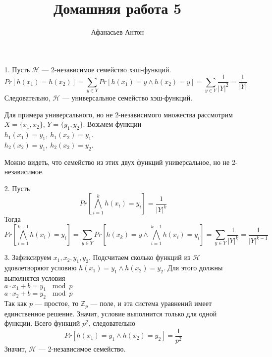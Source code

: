 \documentclass[10pt]{article}
\begin{document}
\title{Домашняя работа 5}
\author{Афанасьев Антон}
\maketitle

\begin{enumerate}
	\item[1.] Пусть $\mathcal{H}$ --- 2-независимое семейство хэш-функций.
	$$Pr[h(x_1) = h(x_2)] = \sum_{y \in Y} Pr[h(x_1) = y \land h(x_2) = y] = \sum_{y \in Y} \frac{1}{|Y|^2} = \frac{1}{|Y|}$$
	Следовательно, $\mathcal{H}$ --- универсальное семейство хэш-функций.
	
	Для примера универсального, но не 2-независимого множества рассмотрим $X=\{ x_1, x_2 \}$, $Y=\{y_1, y_2 \}$. Возьмем функции\\ $h_1(x_1) = y_1,\ h_1(x_2) = y_1$.\\
$h_2(x_2) = y_1,\ h_2(x_2) = y_2$.

Можно видеть, что семейство из этих двух функций универсальное, но не 2-независимое.

	\item[2.] Пусть 
		$$Pr \left [ \bigwedge_{i=1}^k h(x_i) = y_i \right ] = \frac{1}{|Y|^k}$$
		Тогда 
		$$Pr \left [ \bigwedge_{i=1}^{k-1} h(x_i) = y_i \right ] = \sum_{y \in Y} Pr \left [ h(x_k) = y \land \bigwedge_{i=1}^{k-1} h(x_i) = y_i \right ] = \sum_{y \in Y} \frac{1}{|Y|^k} = \frac{1}{|Y|^{k-1}}$$
	
	\item[3.] Зафиксируем $x_1, x_2, y_1, y_2$. Подсчитаем сколько функций из $\mathcal{H}$ удовлетворяют условию $h(x_1) = y_1 \land h(x_2) = y_2$. Для этого должны выполнятся условия\\
	$a \cdot x_1 + b = y_1\ \mod p$\\
	$a \cdot x_2 + b = y_2\ \mod p$\\
	Так как $p$ --- простое, то $\mathbb{Z}_p$ --- поле, и эта система уравнений имеет единственное решение. Значит, условие выполнится только для одной функции. Всего функций $p^2$, следовательно 
	$$Pr[h(x_1) = y_1 \land h(x_2) = y_2] = \frac{1}{p^2}$$
	Значит, $\mathcal{H}$ --- 2-независимое семейство.
\end{enumerate}
\end{document}
